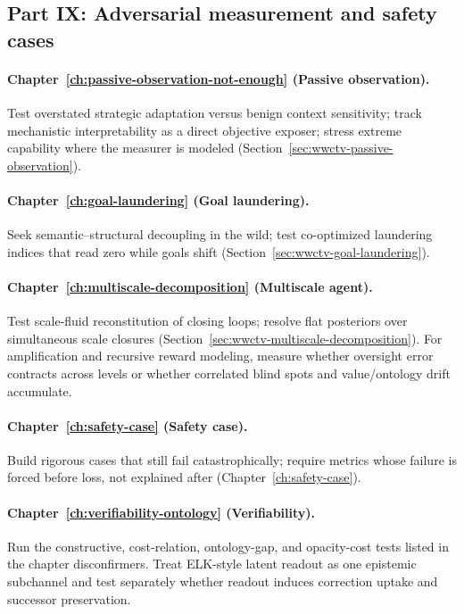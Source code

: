\subsection{Part IX: Adversarial measurement and safety cases}

\paragraph{Chapter~\ref{ch:passive-observation-not-enough} (Passive observation).}
Test overstated strategic adaptation versus benign context sensitivity; track mechanistic interpretability as a direct objective exposer; stress extreme capability where the measurer is modeled (Section~\ref{sec:wwctv-passive-observation}).

\paragraph{Chapter~\ref{ch:goal-laundering} (Goal laundering).}
Seek semantic--structural decoupling in the wild; test co-optimized laundering indices that read zero while goals shift (Section~\ref{sec:wwctv-goal-laundering}).

\paragraph{Chapter~\ref{ch:multiscale-decomposition} (Multiscale agent).}
Test scale-fluid reconstitution of closing loops; resolve flat posteriors over simultaneous scale closures (Section~\ref{sec:wwctv-multiscale-decomposition}). For amplification and recursive reward modeling, measure whether oversight error contracts across levels or whether correlated blind spots and value/ontology drift accumulate.

\paragraph{Chapter~\ref{ch:safety-case} (Safety case).}
Build rigorous cases that still fail catastrophically; require metrics whose failure is forced before loss, not explained after (Chapter~\ref{ch:safety-case}).

\paragraph{Chapter~\ref{ch:verifiability-ontology} (Verifiability).}
Run the constructive, cost-relation, ontology-gap, and opacity-cost tests listed in the chapter disconfirmers. Treat ELK-style latent readout as one epistemic subchannel and test separately whether readout induces correction uptake and successor preservation.

